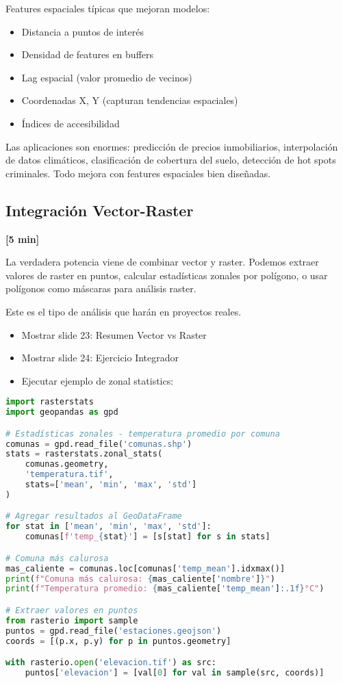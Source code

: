 \documentclass[11pt,a4paper]{article}
\newcommand{\tiempo}[1]{\textcolor{timecolor}{\textbf{[#1]}}}
\newcommand{\decir}[1]{\begin{tcolorbox}[colback=blue!5,colframe=usachblue,title={DECIR}]#1\end{tcolorbox}}
\newcommand{\hacer}[1]{\begin{tcolorbox}[colback=green!5,colframe=green!50!black,title={HACER}]#1\end{tcolorbox}}
\newcommand{\nota}[1]{\begin{tcolorbox}[colback=yellow!10,colframe=orange,title={NOTA}]#1\end{tcolorbox}}
\begin{document}
\nota{
Features espaciales típicas que mejoran modelos:
\begin{itemize}
    \item Distancia a puntos de interés
    \item Densidad de features en buffers
    \item Lag espacial (valor promedio de vecinos)
    \item Coordenadas X, Y (capturan tendencias espaciales)
    \item Índices de accesibilidad
\end{itemize}
}

\decir{
Las aplicaciones son enormes: predicción de precios inmobiliarios, interpolación de datos climáticos, clasificación de cobertura del suelo, detección de hot spots criminales. Todo mejora con features espaciales bien diseñadas.
}

\subsection{Integración Vector-Raster} \tiempo{5 min}

\decir{
La verdadera potencia viene de combinar vector y raster. Podemos extraer valores de raster en puntos, calcular estadísticas zonales por polígono, o usar polígonos como máscaras para análisis raster.

Este es el tipo de análisis que harán en proyectos reales.
}

\hacer{
\begin{itemize}
    \item Mostrar slide 23: Resumen Vector vs Raster
    \item Mostrar slide 24: Ejercicio Integrador
    \item Ejecutar ejemplo de zonal statistics:
\end{itemize}
}

\begin{lstlisting}[language=Python]
import rasterstats
import geopandas as gpd

# Estadísticas zonales - temperatura promedio por comuna
comunas = gpd.read_file('comunas.shp')
stats = rasterstats.zonal_stats(
    comunas.geometry,
    'temperatura.tif',
    stats=['mean', 'min', 'max', 'std']
)

# Agregar resultados al GeoDataFrame
for stat in ['mean', 'min', 'max', 'std']:
    comunas[f'temp_{stat}'] = [s[stat] for s in stats]

# Comuna más calurosa
mas_caliente = comunas.loc[comunas['temp_mean'].idxmax()]
print(f"Comuna más calurosa: {mas_caliente['nombre']}")
print(f"Temperatura promedio: {mas_caliente['temp_mean']:.1f}°C")

# Extraer valores en puntos
from rasterio import sample
puntos = gpd.read_file('estaciones.geojson')
coords = [(p.x, p.y) for p in puntos.geometry]

with rasterio.open('elevacion.tif') as src:
    puntos['elevacion'] = [val[0] for val in sample(src, coords)]
\end{lstlisting}
\end{document}
